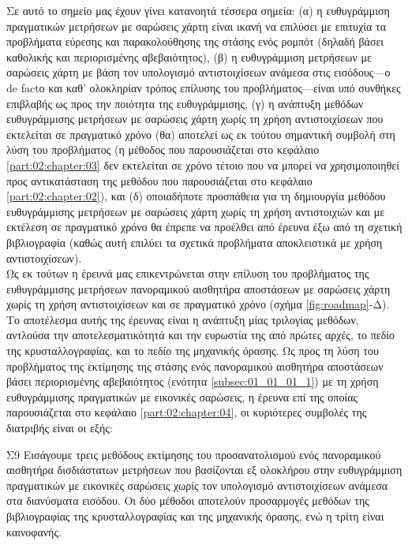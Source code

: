 Σε αυτό το σημείο μας έχουν γίνει κατανοητά τέσσερα σημεία: (α) η ευθυγράμμιση
πραγματικών μετρήσεων με σαρώσεις χάρτη είναι ικανή να επιλύσει με επιτυχία τα
προβλήματα εύρεσης και παρακολούθησης της στάσης ενός ρομπότ (δηλαδή βάσει
καθολικής και περιορισμένης αβεβαιότητος), (β) η ευθυγράμμιση μετρήσεων με
σαρώσεις χάρτη με βάση τον υπολογισμό αντιστοιχίσεων ανάμεσα στις εισόδους---ο
de factο και καθ' ολοκληρίαν τρόπος επίλυσης του προβλήματος---είναι υπό
συνθήκες επιβλαβής ως προς την ποιότητα της ευθυγράμμισης, (γ) η ανάπτυξη
μεθόδων ευθυγράμμισης μετρήσεων με σαρώσεις χάρτη χωρίς τη χρήση αντιστοιχίσεων
που εκτελείται σε πραγματικό χρόνο (θα) αποτελεί ως εκ τούτου σημαντική συμβολή
στη λύση του προβλήματος (η μέθοδος που παρουσιάζεται στο κεφάλαιο
\ref{part:02:chapter:03} δεν εκτελείται σε χρόνο τέτοιο που να μπορεί να
χρησιμοποιηθεί προς αντικατάσταση της μεθόδου που παρουσιάζεται στο κεφάλαιο
\ref{part:02:chapter:02}), και (δ) οποιαδήποτε προσπάθεια για τη δημιουργία
μεθόδου ευθυγράμμισης μετρήσεων με σαρώσεις χάρτη χωρίς τη χρήση αντιστοιχιών
και με εκτέλεση σε πραγματικό χρόνο θα έπρεπε να προέλθει από έρευνα έξω από τη
σχετική βιβλιογραφία (καθώς αυτή επιλύει τα σχετικά προβλήματα αποκλειστικά
με χρήση αντιστοιχίσεων).\\



Ως εκ τούτων η έρευνά μας επικεντρώνεται στην επίλυση του προβλήματος της
ευθυγράμμισης μετρήσεων πανοραμικού αισθητήρα αποστάσεων με σαρώσεις χάρτη
χωρίς τη χρήση αντιστοιχίσεων και σε πραγματικό χρόνο (σχήμα
\ref{fig:roadmap}-Δ). Το αποτέλεσμα αυτής της έρευνας είναι η ανάπτυξη μίας
τριλογίας μεθόδων, αντλούσα την αποτελεσματικότητά και την ευρωστία της από
πρώτες αρχές, το πεδίο της κρυσταλλογραφίας, και το πεδίο της μηχανικής όρασης.
Ως προς τη λύση του προβλήματος της εκτίμησης της στάσης ενός πανοραμικού
αισθητήρα αποστάσεων βάσει περιορισμένης αβεβαιότητος (ενότητα
\ref{subsec:01_01_01_1}) με τη χρήση ευθυγράμμισης πραγματικών με εικονικές
σαρώσεις, η έρευνα επί της οποίας παρουσιάζεται στο κεφάλαιο
\ref{part:02:chapter:04}, οι κυριότερες συμβολές της διατριβής είναι οι εξής:

\begin{bw_box}
\begin{customcontribution}{Σ9}
  \label{contribution:09}
  Εισάγουμε τρεις μεθόδους εκτίμησης του προσανατολισμού ενός πανοραμικού
  αισθητήρα δισδιάστατων μετρήσεων που βασίζονται εξ ολοκλήρου στην
  ευθυγράμμιση πραγματικών με εικονικές σαρώσεις χωρίς τον υπολογισμό
  αντιστοιχίσεων ανάμεσα στα διανύσματα εισόδου. Οι δύο μέθοδοι αποτελούν
  προσαρμογές μεθόδων της βιβλιογραφίας της κρυσταλλογραφίας και της
  μηχανικής όρασης, ενώ η τρίτη είναι καινοφανής.
\end{customcontribution}
\end{bw_box}

